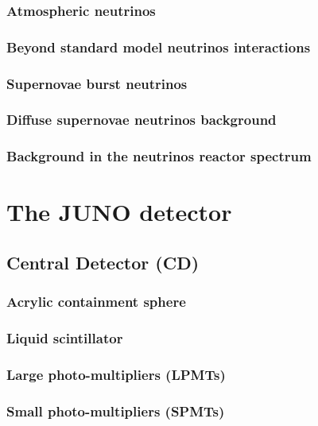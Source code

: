 \subsubsection{Atmospheric neutrinos}

\subsubsection{Beyond standard model neutrinos interactions}

\subsubsection{Supernovae burst neutrinos}

\subsubsection{Diffuse supernovae neutrinos background}

\subsubsection{Background in the neutrinos reactor spectrum}

\section{The JUNO detector}

\subsection{Central Detector (CD)}

\subsubsection{Acrylic containment sphere}

\subsubsection{Liquid scintillator}

\subsubsection{Large photo-multipliers (LPMTs)}

\subsubsection{Small photo-multipliers (SPMTs)}


